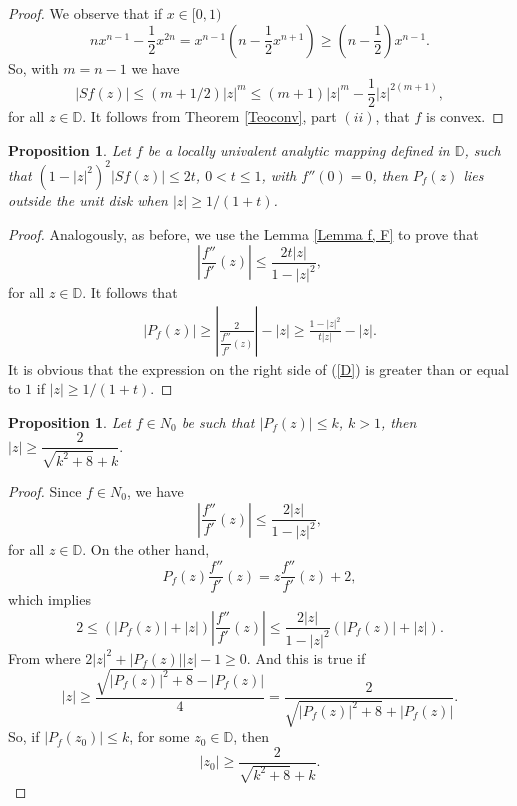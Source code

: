 \documentclass[reqno]{amsart}
\theoremstyle{plain}
\newtheorem{prop}[theo]{Proposition}
\theoremstyle{definition}
\newcommand{\D}{\mathbb{D}}
\begin{document}
\begin{proof}
We observe that if $x\in[0,1)$ 
\[nx^{n-1}-\frac{1}{2}x^{2n}=x^{n-1}(n-\frac{1}{2}x^{n+1})\geq (n-\frac{1}{2})x^{n-1}.\]
So, with $m=n-1$ we have
\[|Sf(z)|\leq (m+1/2)|z|^{m}\leq (m+1)|z|^m-\frac{1}{2}|z|^{2(m+1)},\]
for all $z\in \D$. It follows from Theorem \ref{Teoconv}, part $(ii)$, that $f$ is convex.
\end{proof}

\begin{prop}
  Let $f$ be a locally univalent analytic mapping defined in $\D$, such that $(1-|z|^2)^2|Sf(z)|\leq 2t$, $0<t\leq 1$, with $f''(0)=0$, then $P_f(z)$ lies outside the unit disk when $|z|\geq 1/(1+t)$. 
\end{prop}    

\begin{proof} Analogously, as before, we use the Lemma \ref{Lemma f, F} to prove that \[ \left| \frac{f''}{f'}(z) \right| \leq \frac{2t|z|}{1-|z|^2}, \] for all $z\in \D$. It follows that
\begin{align} \label{D}
|P_f(z)|\geq \left|\frac{2}{\dfrac{f''}{f'}(z)}\right|-|z|\geq \frac{1-|z|^2}{t|z|}-|z|. 
\end{align}
It is obvious that the expression on the right side of (\ref{D}) is greater than or equal to $1$ if $|z|\geq 1/(1+t)$.
\end{proof}


\begin{prop}
  Let $f\in N_0$ be such that $|P_f(z)|\leq k$, $k>1$, then $|z|\geq \dfrac{2}{\sqrt{k^2+8}+k}.$
\end{prop}
\begin{proof}
  Since $f\in N_0$, we have
\[\left| \frac{f''}{f'}(z) \right| \leq \frac{2|z|}{1-|z|^2},\]
 for all $z\in \D$. On the other hand, 
  \[P_f(z)\frac{f''}{f'}(z)=z\frac{f''}{f'}(z)+2,\]
  which implies
  \[2\leq (|P_f(z)|+|z|)\left| \frac{f''}{f'}(z) \right|\leq \frac{2|z|}{1-|z|^2}(|P_f(z)|+|z|).\]
  From where $2|z|^2+|P_f(z)||z|-1\geq 0$. And this is true if
  \[|z|\geq \frac{\sqrt{|P_f(z)|^2+8}-|P_f(z)|}{4}=\frac{2}{\sqrt{|P_f(z)|^2+8}+|P_f(z)|}.\]
  So, if $|P_f(z_0)|\leq k$, for some $z_0\in \D$, then
\[|z_0|\geq \dfrac{2}{\sqrt{k^2+8}+k}.
  \]
\end{proof} 
\end{document}
